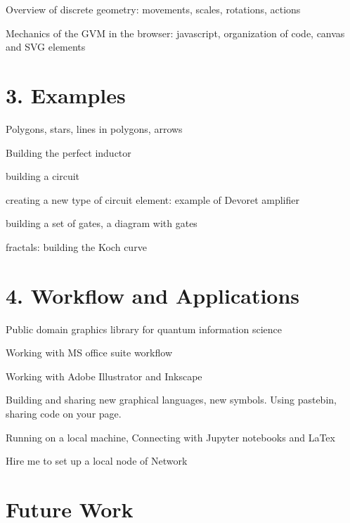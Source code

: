 \documentclass[11pt]{article}
\begin{document}
    Overview of discrete geometry: movements, scales, rotations, actions


Mechanics of the GVM in the browser: javascript, organization of code, canvas and SVG elements


\section{
3. Examples}




    Polygons, stars, lines in polygons, arrows




    Building the perfect inductor




    building a circuit 




    creating a new type of circuit element: example of Devoret amplifier




    building a set of gates, a diagram with gates




    fractals: building the Koch curve






\section{
4. Workflow and Applications}



    Public domain graphics library for quantum information science




    Working with MS office suite workflow




    Working with Adobe Illustrator and Inkscape




    Building and sharing new graphical languages, new symbols.  Using pastebin, sharing code on your page.




    Running on a local machine, Connecting with Jupyter notebooks and LaTex



Hire me to set up a local node of Network


\section{
Future Work}
\end{document}
